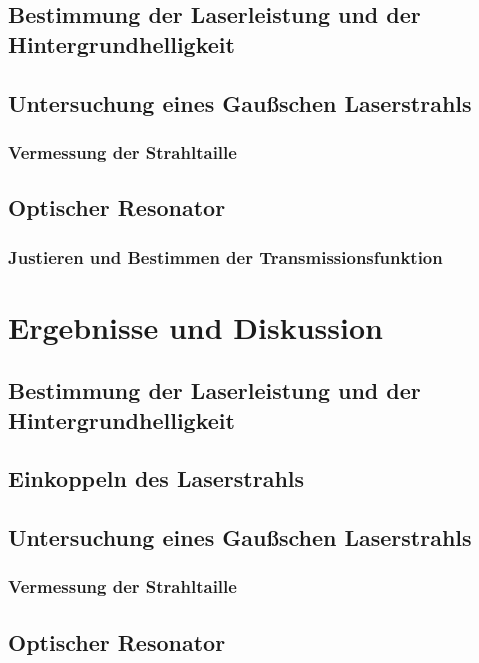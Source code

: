 \documentclass[11pt,a4paper,oneside]{scrartcl}
\begin{document}
\subsection{Bestimmung der Laserleistung und der Hintergrundhelligkeit}

\subsection{Untersuchung eines Gaußschen Laserstrahls}

\subsubsection{Vermessung der Strahltaille}\label{Durchführung Vermessung der Strahltaille}

\subsection{Optischer Resonator}

\subsubsection{Justieren und Bestimmen der Transmissionsfunktion}

\section{Ergebnisse und Diskussion}
\subsection{Bestimmung der Laserleistung und der Hintergrundhelligkeit}

\subsection{Einkoppeln des Laserstrahls}
\subsection{Untersuchung eines Gaußschen Laserstrahls}
\subsubsection{Vermessung der Strahltaille}\label{Auswertung Vermessung der Strahltaille}

\subsection{Optischer Resonator}
\end{document}
